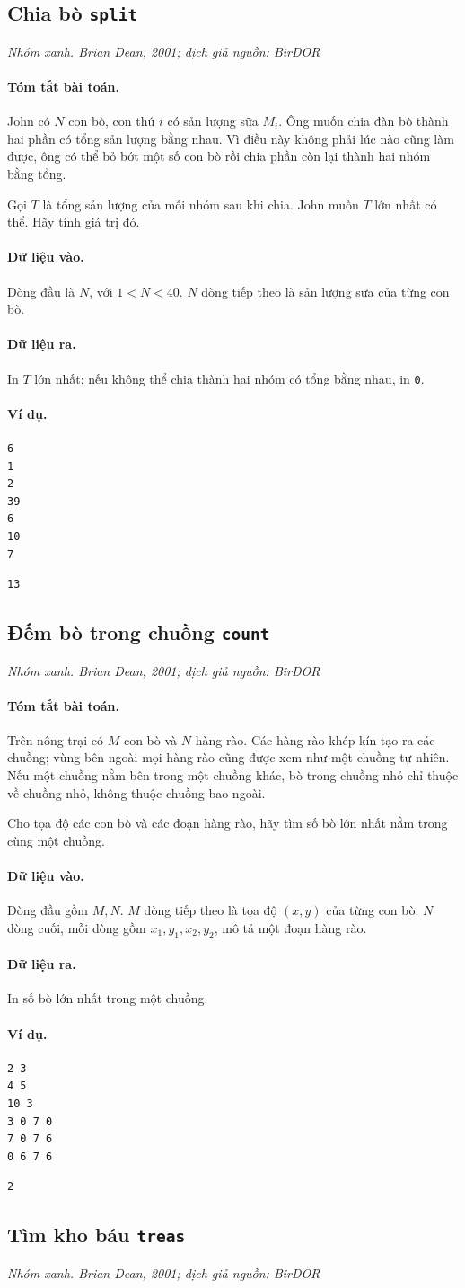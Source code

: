 \documentclass[11pt]{article}
\newcommand{\problem}[4]{%
  \subsection[#1 (#2)]{#1 \hfill {\normalsize\texttt{#2}}}%
  \noindent\textit{#3. #4}\par\smallskip
}
\newcommand{\iosec}[1]{\paragraph{#1}}
\begin{document}
\problem{Chia bò}{split}{Nhóm xanh}{Brian Dean, 2001; dịch giả nguồn: BirDOR}

\iosec{Tóm tắt bài toán.}
John có \(N\) con bò, con thứ \(i\) có sản lượng sữa \(M_i\). Ông muốn chia
đàn bò thành hai phần có tổng sản lượng bằng nhau. Vì điều này không phải lúc
nào cũng làm được, ông có thể bỏ bớt một số con bò rồi chia phần còn lại thành
hai nhóm bằng tổng.

Gọi \(T\) là tổng sản lượng của mỗi nhóm sau khi chia. John muốn \(T\) lớn
nhất có thể. Hãy tính giá trị đó.

\iosec{Dữ liệu vào.}
Dòng đầu là \(N\), với \(1<N<40\). \(N\) dòng tiếp theo là sản lượng sữa của
từng con bò.

\iosec{Dữ liệu ra.}
In \(T\) lớn nhất; nếu không thể chia thành hai nhóm có tổng bằng nhau, in
\texttt{0}.

\iosec{Ví dụ.}
\begin{verbatim}
6
1
2
39
6
10
7
\end{verbatim}

\begin{verbatim}
13
\end{verbatim}

\problem{Đếm bò trong chuồng}{count}{Nhóm xanh}{Brian Dean, 2001; dịch giả nguồn: BirDOR}

\iosec{Tóm tắt bài toán.}
Trên nông trại có \(M\) con bò và \(N\) hàng rào. Các hàng rào khép kín tạo ra
các chuồng; vùng bên ngoài mọi hàng rào cũng được xem như một chuồng tự nhiên.
Nếu một chuồng nằm bên trong một chuồng khác, bò trong chuồng nhỏ chỉ thuộc về
chuồng nhỏ, không thuộc chuồng bao ngoài.

Cho tọa độ các con bò và các đoạn hàng rào, hãy tìm số bò lớn nhất nằm trong
cùng một chuồng.

\iosec{Dữ liệu vào.}
Dòng đầu gồm \(M,N\). \(M\) dòng tiếp theo là tọa độ \((x,y)\) của từng con
bò. \(N\) dòng cuối, mỗi dòng gồm \(x_1,y_1,x_2,y_2\), mô tả một đoạn hàng rào.

\iosec{Dữ liệu ra.}
In số bò lớn nhất trong một chuồng.

\iosec{Ví dụ.}
\begin{verbatim}
2 3
4 5
10 3
3 0 7 0
7 0 7 6
0 6 7 6
\end{verbatim}

\begin{verbatim}
2
\end{verbatim}

\problem{Tìm kho báu}{treas}{Nhóm xanh}{Brian Dean, 2001; dịch giả nguồn: BirDOR}
\end{document}
